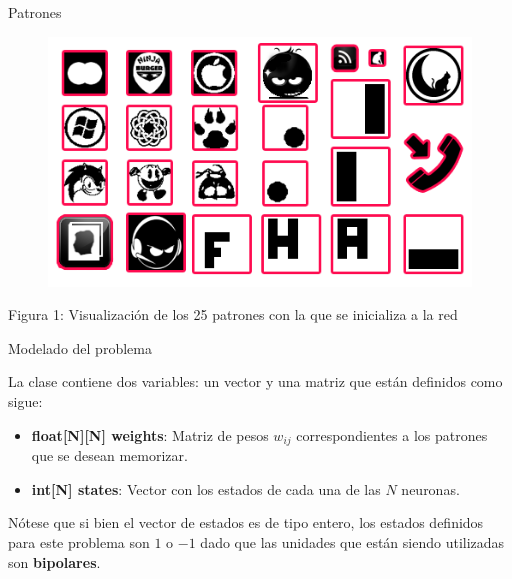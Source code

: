 \documentclass{beamer}
\begin{document}
\begin{frame}{Patrones}

\begin{figure}[H]
\begin{center}
\includegraphics[scale=0.40]{./images/patterns.png}
\label{modelado}
\end{center}
\end{figure}

\begin{center}
\par Figura 1: Visualización de los 25 patrones con la que se inicializa a la red
\end{center}

\end{frame}

\begin{frame}{Modelado del problema}

La clase contiene dos variables: un vector y una matriz que están definidos como sigue:\\

\begin{itemize}
\item \textbf{float[N][N] weights}: Matriz de pesos $w_{ij}$ correspondientes a los patrones que se desean memorizar.
\item \textbf{int[N] states}: Vector con los estados de cada una de las $N$ neuronas.\\
\end{itemize}

\par Nótese que si bien el vector de estados es de tipo entero, los estados definidos para este problema son $1$ o $-1$ dado que las unidades que están siendo utilizadas son \textbf{bipolares}.\\

\end{frame}
\end{document}
